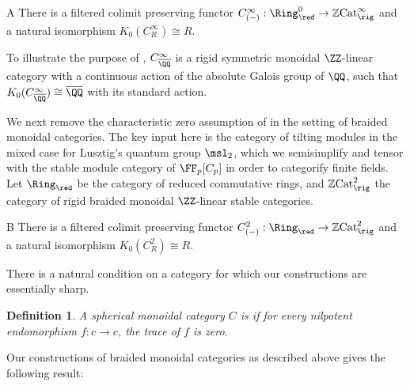 \documentclass[12pt,oneside]{article}
\newcommand{\ZCat}{\mathbb{Z}\mathrm{Cat}}
\newcounter{counter}
\newtheorem{dfn}[counter]{Definition}
\begin{document}
	\begin{customthm}{A}\label{thm:functorial}
		There is a filtered colimit preserving functor $C^{\infty}_{(-)}:\Ring_{\red}^0 \to \ZCat^{\infty}_{\rig}$ and a natural isomorphism $K_0(C^{\infty}_R) \cong R$.
	\end{customthm}

	To illustrate the purpose of , $C^{\infty}_{\overline{\QQ}}$ is a rigid symmetric monoidal $\ZZ$-linear category with a continuous action of the absolute Galois group of $\QQ$, such that $K_0(C^{\infty}_{\overline{\QQ}}) \cong \overline{\QQ}$ with its standard action.
	
	We next remove the characteristic zero assumption of  in the setting of braided monoidal categories. The key input here is the category of tilting modules in the mixed case for Lusztig's quantum group $\msl_2$, which we semisimplify and tensor with the stable module category of $\FF_p[C_p]$ in order to categorify finite fields. Let $\Ring_{\red}$ be the category of reduced commutative rings, and $\ZCat^{2}_{\rig}$ the category of rigid braided monoidal $\ZZ$-linear stable categories.
	
	\begin{customthm}{B}\label{thm:functorialmon}
		There is a filtered colimit preserving functor $C^2_{(-)}:\Ring_{\red} \to \ZCat^2_{\rig}$ and a natural isomorphism $K_0(C^2_R) \cong R$.
	\end{customthm}

	There is a natural condition on a category for which our constructions are essentially sharp.
	
	\begin{dfn}
		A spherical monoidal category $C$ is  if for every nilpotent endomorphism $f:c \to c$, the trace of $f$ is zero. 
	\end{dfn}

	Our constructions of braided monoidal categories as described above gives the following result:

	
\end{document}
